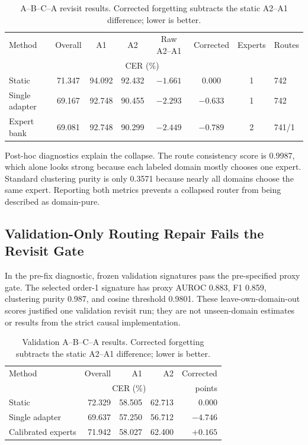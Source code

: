 \begin{table}[t]
\centering
\caption{A--B--C--A revisit results. Corrected forgetting subtracts the static A2--A1 difference; lower is better.}
\label{tab:revisit}
\begin{tabular}{lccccccl}
\toprule
Method & Overall & A1 & A2 & Raw A2--A1 & Corrected & Experts & Routes \\
 & \multicolumn{5}{c}{CER (\%)} & & \\
\midrule
Static & 71.347 & 94.092 & 92.432 & $-1.661$ & 0.000 & 1 & 742 \\
Single adapter & 69.167 & 92.748 & 90.455 & $-2.293$ & $-0.633$ & 1 & 742 \\
Expert bank & 69.081 & 92.748 & 90.299 & $-2.449$ & $-0.789$ & 2 & 741/1 \\
\bottomrule
\end{tabular}
\end{table}

Post-hoc diagnostics explain the collapse. The route consistency score is 0.9987, which alone looks strong because each labeled domain mostly chooses one expert. Standard clustering purity is only 0.3571 because nearly all domains choose the same expert. Reporting both metrics prevents a collapsed router from being described as domain-pure.

\subsection{Validation-Only Routing Repair Fails the Revisit Gate}

In the pre-fix diagnostic, frozen validation signatures pass the pre-specified proxy gate. The selected order-1 signature has proxy AUROC 0.883, F1 0.859, clustering purity 0.987, and cosine threshold 0.9801. These leave-own-domain-out scores justified one validation revisit run; they are not unseen-domain estimates or results from the strict causal implementation.

\begin{table}[t]
\centering
\caption{Validation A--B--C--A results. Corrected forgetting subtracts the static A2--A1 difference; lower is better.}
\label{tab:validation_revisit}
\begin{tabular}{lrrrr}
\toprule
Method & Overall & A1 & A2 & Corrected \\
 & \multicolumn{3}{c}{CER (\%)} & points \\
\midrule
Static & 72.329 & 58.505 & 62.713 & 0.000 \\
Single adapter & 69.637 & 57.250 & 56.712 & $-4.746$ \\
Calibrated experts & 71.942 & 58.027 & 62.400 & $+0.165$ \\
\bottomrule
\end{tabular}
\end{table}

